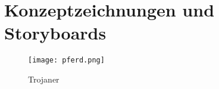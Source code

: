 \section{Konzeptzeichnungen und Storyboards}


\begin{figure}[ht]
	\centering
	\texttt{[image: pferd.png]}
	\caption{Trojaner}
	\label{fig:pferd}
\end{figure}